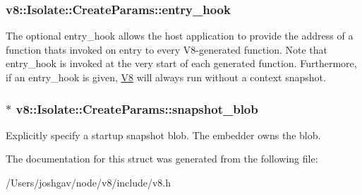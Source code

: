 \subsubsection[{\texorpdfstring{entry\+\_\+hook}{entry_hook}}]{ v8\+::\+Isolate\+::\+Create\+Params\+::entry\+\_\+hook}\hypertarget{structv8_1_1_isolate_1_1_create_params_aa7aa18bbe2d86713e5b074a93b38dc60}{}\label{structv8_1_1_isolate_1_1_create_params_aa7aa18bbe2d86713e5b074a93b38dc60}
The optional entry\+\_\+hook allows the host application to provide the address of a function that\textquotesingle{}s invoked on entry to every V8-\/generated function. Note that entry\+\_\+hook is invoked at the very start of each generated function. Furthermore, if an entry\+\_\+hook is given, \hyperlink{classv8_1_1_v8}{V8} will always run without a context snapshot. 
\subsubsection[{\texorpdfstring{snapshot\+\_\+blob}{snapshot_blob}}]{$\ast$ v8\+::\+Isolate\+::\+Create\+Params\+::snapshot\+\_\+blob}\hypertarget{structv8_1_1_isolate_1_1_create_params_a25d38476e4dec79ae96c59292eee4a64}{}\label{structv8_1_1_isolate_1_1_create_params_a25d38476e4dec79ae96c59292eee4a64}
Explicitly specify a startup snapshot blob. The embedder owns the blob. 

The documentation for this struct was generated from the following file\+:\begin{DoxyCompactItemize}
\item 
/\+Users/joshgav/node/v8/include/v8.\+h\end{DoxyCompactItemize}
